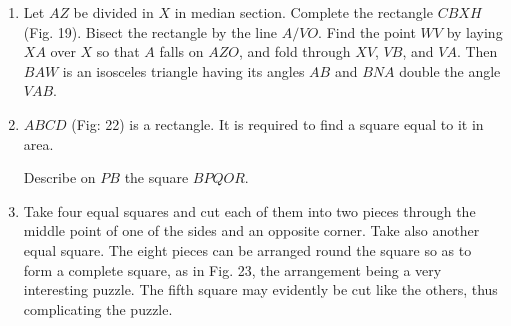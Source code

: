 \begin{enumerate}
    \item Let $AZ$ be divided in $X$ in median section.  Complete the rectangle
        $CBXH$ (Fig.  19).  Bisect the rectangle by the line $A/VO$. Find the
        point $WV$ by laying $XA$ over $X$ so that $A$ falls on $AZO$, and fold
        through $XV$, $VB$, and $VA$.  Then $BAW$ is an isosceles triangle
        having its angles $AB$ and $BNA$ double the angle $VAB$.

%
%
%
%
%
%
%
%
%
%
%
%
%
%
%
%
%
%
%

    \item $ABCD$ (Fig: 22) is a rectangle.  It is required to find a square
        equal to it in area.


%
        Describe on $PB$ the square $BPQOR$.

%
%
%
%
%
%

    \item Take four equal squares and cut each of them into two pieces through
        the middle point of one of the sides and an opposite corner. Take also
        another equal square. The eight pieces can be arranged round the square
        so as to form a complete square, as in Fig.  23, the arrangement being a
        very interesting puzzle.  The fifth square may evidently be cut like the
        others, thus complicating the puzzle.  


\end{enumerate}
